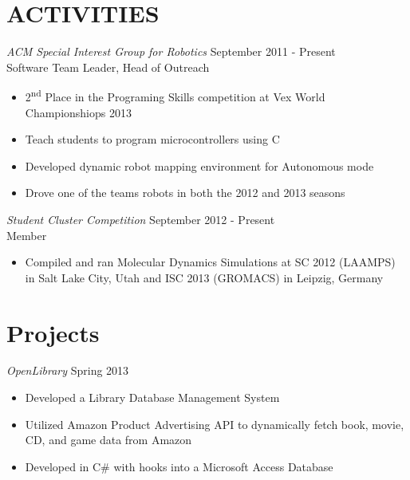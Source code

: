 \documentclass[line,margin]{res}
\begin{document}
\begin{resume}
\section{\textcolor{TealBlue}{ACTIVITIES}}
				{\sl ACM Special Interest Group for Robotics} \hfill September 2011 - Present \\
                Software Team Leader, Head of Outreach
                \begin{itemize}  \itemsep -2pt %
                  \item 2\textsuperscript{nd} Place in the Programing Skills competition at Vex World Championshiops 2013
                  \item Teach students to program microcontrollers using C
                  \item Developed dynamic robot mapping environment for Autonomous mode
                  \item Drove one of the teams robots in both the 2012 and 2013 seasons
                \end{itemize}
                
        {\sl Student Cluster Competition} \hfill September 2012 - Present \\
                Member
                \begin{itemize}  \itemsep -2pt %
                  \item Compiled and ran Molecular Dynamics Simulations at SC 2012 (LAAMPS) in Salt Lake City, Utah and ISC 2013 (GROMACS) in Leipzig, Germany
                \end{itemize}
                
\section{\textcolor{TealBlue}{Projects}}
				{\sl OpenLibrary} \hfill Spring 2013
                \begin{itemize}  \itemsep -2pt %
                  \item Developed a Library Database Management System
                  \item Utilized Amazon Product Advertising API to dynamically fetch book, movie, CD, and game data from Amazon
                  \item Developed in C\# with hooks into a Microsoft Access Database
                \end{itemize}
                

\end{resume}
\end{document}
